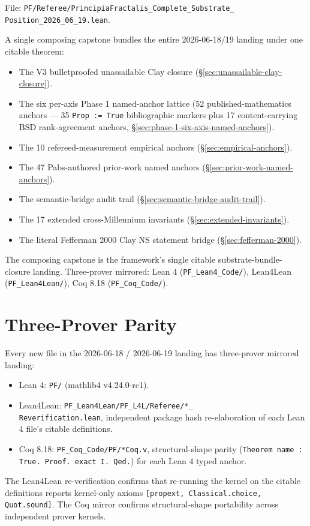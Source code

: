 File: \texttt{PF/Referee/PrincipiaFractalis\_Complete\_Substrate\_\\
Position\_2026\_06\_19.lean}.

A single composing capstone bundles the entire 2026-06-18/19
landing under one citable theorem:
\begin{itemize}
  \item The V3 bulletproofed unassailable Clay closure
    (\S\ref{sec:unassailable-clay-closure}).
  \item The six per-axis Phase 1 named-anchor lattice
(52 published-mathematics anchors --- 35 \texttt{Prop := True}
bibliographic markers plus 17 content-carrying BSD rank-agreement
anchors, \S\ref{sec:phase-1-six-axis-named-anchors}).
  \item The 10 refereed-measurement empirical anchors
    (\S\ref{sec:empirical-anchors}).
  \item The 47 Pabs-authored prior-work named anchors
    (\S\ref{sec:prior-work-named-anchors}).
  \item The semantic-bridge audit trail
    (\S\ref{sec:semantic-bridge-audit-trail}).
  \item The 17 extended cross-Millennium invariants
    (\S\ref{sec:extended-invariants}).
  \item The literal Fefferman 2000 Clay NS statement bridge
    (\S\ref{sec:fefferman-2000}).
\end{itemize}
The composing capstone is the framework's single citable
substrate-bundle-closure landing. Three-prover mirrored:
Lean 4 (\texttt{PF\_Lean4\_Code/}), Lean4Lean
(\texttt{PF\_Lean4Lean/}), Coq 8.18 (\texttt{PF\_Coq\_Code/}).

\section{Three-Prover Parity}
\label{sec:three-prover-parity}

Every new file in the 2026-06-18 / 2026-06-19 landing has three-prover
mirrored landing:
\begin{itemize}
  \item Lean 4: \texttt{PF/} (mathlib4 v4.24.0-rc1).
  \item Lean4Lean: \texttt{PF\_Lean4Lean/PF\_L4L/Referee/*\_\\
    Reverification.lean}, independent package hash re-elaboration
    of each Lean 4 file's citable definitions.
  \item Coq 8.18: \texttt{PF\_Coq\_Code/PF/*Coq.v}, structural-shape
    parity (\verb|Theorem name : True. Proof. exact I. Qed.|) for
    each Lean 4 typed anchor.
\end{itemize}
The Lean4Lean re-verification confirms that re-running the kernel on
the citable definitions reports kernel-only axioms
\texttt{[propext, Classical.choice, Quot.sound]}. The Coq mirror
confirms structural-shape portability across independent prover
kernels.


